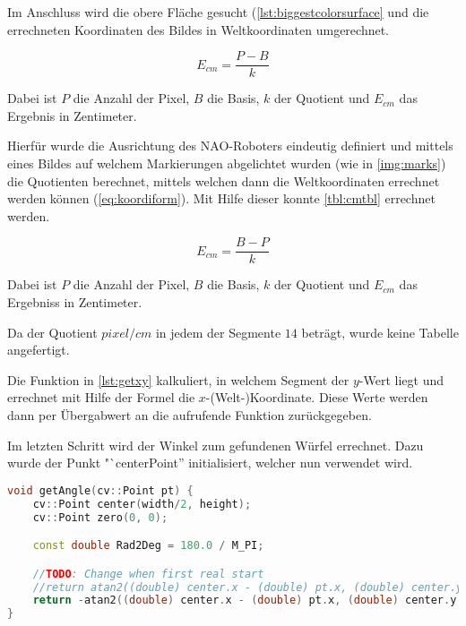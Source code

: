         Im Anschluss wird die obere Fläche gesucht
        (\autoref{lst:biggestcolorsurface} und die errechneten Koordinaten des
        Bildes in Weltkoordinaten umgerechnet.

        \begin{equation} \label{eq:koordiform}
            E_{cm} = \frac{P - B}{k}
        \end{equation}

        Dabei ist $P$ die Anzahl der Pixel, $B$ die Basis, $k$ der Quotient und
        $E_{cm}$ das Ergebnis in Zentimeter.

        Hierfür wurde die Ausrichtung des NAO-Roboters eindeutig definiert und
        mittels eines Bildes auf welchem Markierungen abgelichtet wurden
        (wie in \ref{img:marks})
        die Quotienten berechnet, mittels welchen dann die Weltkoordinaten
        errechnet werden können (\ref{eq:koordiform}).
        Mit Hilfe dieser konnte \autoref{tbl:cmtbl} errechnet werden.

        \begin{equation} \label{eq:ykoord}
            E_{cm} = \frac{B - P}{k}
        \end{equation}

        Dabei ist $P$ die Anzahl der Pixel, $B$ die Basis, $k$ der Quotient und
        $E_{cm}$ das Ergebniss in Zentimeter.

        Da der Quotient $pixel / cm$ in jedem der Segmente $14$ beträgt, wurde
        keine Tabelle angefertigt.

        Die Funktion in \autoref{lst:getxy} kalkuliert, in welchem Segment der
        $y$-Wert liegt und errechnet mit Hilfe der Formel die
        $x$-(Welt-)Koordinate.
        Diese Werte werden dann per Übergabwert an die aufrufende Funktion
        zurückgegeben.

        Im letzten Schritt wird der Winkel zum gefundenen Würfel errechnet.
        Dazu wurde der Punkt "`centerPoint'' initialisiert, welcher nun
        verwendet wird.

\begin{lstlisting}[language=c++,
                   caption={Funktion: "`getAngle''},
                   label={lst:getAngle}]
void getAngle(cv::Point pt) {
    cv::Point center(width/2, height);
    cv::Point zero(0, 0);

    const double Rad2Deg = 180.0 / M_PI;

    //TODO: Change when first real start
    //return atan2((double) center.x - (double) pt.x, (double) center.y - (double) pt.y) * Rad2Deg; //degree
    return -atan2((double) center.x - (double) pt.x, (double) center.y - (double)pt.y); //rad
}
\end{lstlisting}

